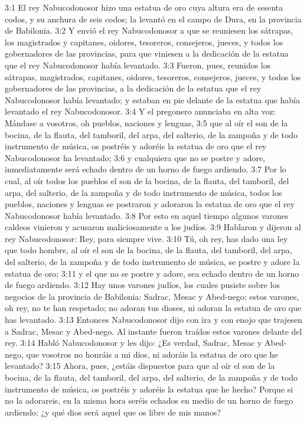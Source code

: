 3:1 El rey Nabucodonosor hizo una estatua de oro cuya altura era de sesenta codos, y su anchura de seis codos; la levantó en el campo de Dura, en la provincia de Babilonia. 
3:2 Y envió el rey Nabucodonosor a que se reuniesen los sátrapas, los magistrados y capitanes, oidores, tesoreros, consejeros, jueces, y todos los gobernadores de las provincias, para que viniesen a la dedicación de la estatua que el rey Nabucodonosor había levantado. 
3:3 Fueron, pues, reunidos los sátrapas, magistrados, capitanes, oidores, tesoreros, consejeros, jueces, y todos los gobernadores de las provincias, a la dedicación de la estatua que el rey Nabucodonosor había levantado; y estaban en pie delante de la estatua que había levantado el rey Nabucodonosor. 
3:4 Y el pregonero anunciaba en alta voz: Mándase a vosotros, oh pueblos, naciones y lenguas, 
3:5 que al oír el son de la bocina, de la flauta, del tamboril, del arpa, del salterio, de la zampoña y de todo instrumento de música, os postréis y adoréis la estatua de oro que el rey Nabucodonosor ha levantado; 
3:6 y cualquiera que no se postre y adore, inmediatamente será echado dentro de un horno de fuego ardiendo. 
3:7 Por lo cual, al oír todos los pueblos el son de la bocina, de la flauta, del tamboril, del arpa, del salterio, de la zampoña y de todo instrumento de música, todos los pueblos, naciones y lenguas se postraron y adoraron la estatua de oro que el rey Nabucodonosor había levantado. 
3:8 Por esto en aquel tiempo algunos varones caldeos vinieron y acusaron maliciosamente a los judíos. 
3:9 Hablaron y dijeron al rey Nabucodonosor: Rey, para siempre vive. 
3:10 Tú, oh rey, has dado una ley que todo hombre, al oír el son de la bocina, de la flauta, del tamboril, del arpa, del salterio, de la zampoña y de todo instrumento de música, se postre y adore la estatua de oro; 
3:11 y el que no se postre y adore, sea echado dentro de un horno de fuego ardiendo. 
3:12 Hay unos varones judíos, los cuales pusiste sobre los negocios de la provincia de Babilonia: Sadrac, Mesac y Abed-nego; estos varones, oh rey, no te han respetado; no adoran tus dioses, ni adoran la estatua de oro que has levantado. 
3:13 Entonces Nabucodonosor dijo con ira y con enojo que trajesen a Sadrac, Mesac y Abed-nego. Al instante fueron traídos estos varones delante del rey. 
3:14 Habló Nabucodonosor y les dijo: ¿Es verdad, Sadrac, Mesac y Abed-nego, que vosotros no honráis a mi dios, ni adoráis la estatua de oro que he levantado? 
3:15 Ahora, pues, ¿estáis dispuestos para que al oír el son de la bocina, de la flauta, del tamboril, del arpa, del salterio, de la zampoña y de todo instrumento de música, os postréis y adoréis la estatua que he hecho? Porque si no la adorareis, en la misma hora seréis echados en medio de un horno de fuego ardiendo; ¿y qué dios será aquel que os libre de mis manos? 

